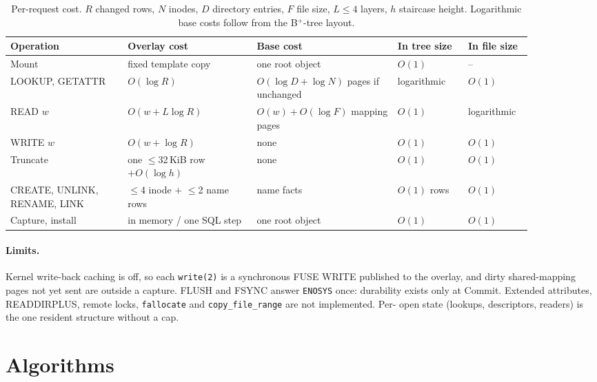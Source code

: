 \begin{table}[h]
\centering
\small
\begin{tabular}{p{0.20\linewidth} p{0.22\linewidth} p{0.24\linewidth} p{0.12\linewidth} p{0.10\linewidth}}
\toprule
Operation & Overlay cost & Base cost & In tree size & In file size \\
\midrule
Mount & fixed template copy & one root object & $O(1)$ & -- \\
LOOKUP, GETATTR & $O(\log R)$ & $O(\log D + \log N)$ pages if unchanged & logarithmic & $O(1)$ \\
READ $w$ & $O(w + L\log R)$ & $O(w) + O(\log F)$ mapping pages & $O(1)$ & logarithmic \\
WRITE $w$ & $O(w + \log R)$ & none & $O(1)$ & $O(1)$ \\
Truncate & one $\leq$32\,KiB row $+ O(\log h)$ & none & $O(1)$ & $O(1)$ \\
CREATE, UNLINK, RENAME, LINK & $\leq$4 inode $+$ $\leq$2 name rows & name facts & $O(1)$ rows & $O(1)$ \\
Capture, install & in memory / one SQL step & one root object & $O(1)$ & $O(1)$ \\
\bottomrule
\end{tabular}
\caption{Per-request cost. $R$ changed rows, $N$ inodes, $D$ directory entries, $F$ file
size, $L \leq 4$ layers, $h$ staircase height. Logarithmic base costs follow from the
B$^+$-tree layout.}
\label{tab:overlaycost}
\end{table}

\paragraph{Limits.} Kernel write-back caching is off, so each \texttt{write(2)} is a
synchronous FUSE WRITE published to the overlay, and dirty shared-mapping pages not yet
sent are outside a capture. FLUSH and FSYNC answer \texttt{ENOSYS} once: durability
exists only at Commit. Extended attributes, READDIRPLUS, remote locks, \texttt{fallocate}
and \texttt{copy\_file\_range} are not implemented. Per-\ws{} open state (lookups,
descriptors, readers) is the one resident structure without a cap.


\section{Algorithms}
\label{app:algorithms}

